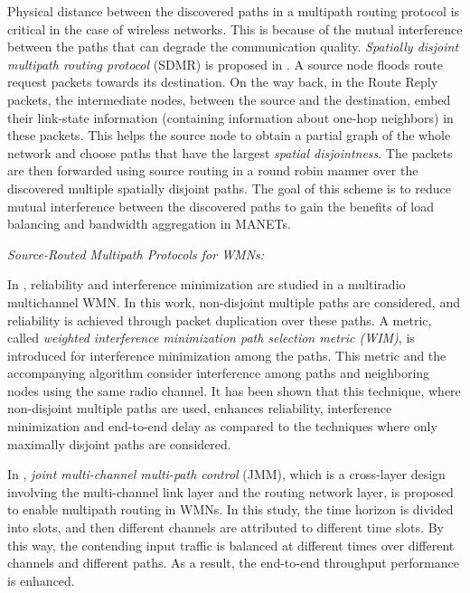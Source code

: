 \documentclass[10pt]{IEEEtran}
\begin{document}
Physical distance between the discovered paths in a multipath routing protocol is critical in the case of wireless networks. This is because of the mutual interference between the paths that can degrade the communication quality. \textit{Spatially disjoint multipath routing protocol} (SDMR) is proposed in \cite{galvez2008spatially}. A source node floods route request packets towards its destination. On the way back, in the Route Reply packets, the intermediate nodes, between the source and the destination, embed their link-state information (containing information about one-hop neighbors) in these packets. This helps the source node to obtain a partial graph of the whole network and choose paths that have the largest \textit{spatial disjointness}. The packets are then forwarded using source routing in a round robin manner over the discovered multiple spatially disjoint paths. The goal of this scheme is to reduce mutual interference between the discovered paths to gain the benefits of load balancing and bandwidth aggregation in MANETs.

\vspace{2mm}
\textit{Source-Routed Multipath Protocols for WMNs:}
\vspace{1mm}

In \cite{tsai2007interference}, reliability and interference minimization are studied in a multiradio multichannel WMN. In this work, non-disjoint multiple paths are considered, and reliability is achieved through packet duplication over these paths. A metric, called \textit{weighted interference minimization path selection metric (WIM)}, is introduced for interference minimization among the paths. This metric and the accompanying algorithm consider interference among paths and neighboring nodes using the same radio channel. It has been shown that this technique, where non-disjoint multiple paths are used, enhances reliability, interference minimization and end-to-end delay as compared to the techniques where only maximally disjoint paths are considered.

In \cite{tam2007joint}, \textit{joint multi-channel multi-path control} (JMM), which is a cross-layer design involving the multi-channel link layer and the routing network layer, is proposed to enable multipath routing in WMNs. In this study, the time horizon is divided into slots, and then different channels are attributed to different time slots. By this way, the contending input traffic is balanced at different times over different channels and different paths. As a result, the end-to-end throughput performance is enhanced.
\end{document}
